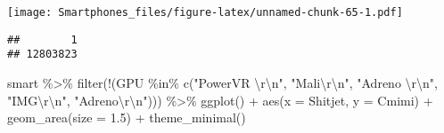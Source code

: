 \documentclass[
]{article}
\newenvironment{Shaded}{\begin{snugshade}}{\end{snugshade}}
\newcommand{\AttributeTok}[1]{\textcolor[rgb]{0.77,0.63,0.00}{#1}}
\newcommand{\CommentTok}[1]{\textcolor[rgb]{0.56,0.35,0.01}{\textit{#1}}}
\newcommand{\DecValTok}[1]{\textcolor[rgb]{0.00,0.00,0.81}{#1}}
\newcommand{\FloatTok}[1]{\textcolor[rgb]{0.00,0.00,0.81}{#1}}
\newcommand{\FunctionTok}[1]{\textcolor[rgb]{0.00,0.00,0.00}{#1}}
\newcommand{\NormalTok}[1]{#1}
\newcommand{\OtherTok}[1]{\textcolor[rgb]{0.56,0.35,0.01}{#1}}
\newcommand{\SpecialCharTok}[1]{\textcolor[rgb]{0.00,0.00,0.00}{#1}}
\newcommand{\StringTok}[1]{\textcolor[rgb]{0.31,0.60,0.02}{#1}}
\begin{document}
\texttt{[image: Smartphones\_files/figure-latex/unnamed-chunk-65-1.pdf]}

\begin{Shaded}
\end{Shaded}

\begin{verbatim}
##        1 
## 12803823
\end{verbatim}

\begin{Shaded}
\begin{Highlighting}[]
\NormalTok{smart }\SpecialCharTok{\%\textgreater{}\%}
 \FunctionTok{filter}\NormalTok{(}\SpecialCharTok{!}\NormalTok{(GPU }\SpecialCharTok{\%in\%} \FunctionTok{c}\NormalTok{(}\StringTok{"PowerVR }\SpecialCharTok{\textbackslash{}r\textbackslash{}n}\StringTok{"}\NormalTok{, }\StringTok{"Mali}\SpecialCharTok{\textbackslash{}r\textbackslash{}n}\StringTok{"}\NormalTok{, }\StringTok{"Adreno }\SpecialCharTok{\textbackslash{}r\textbackslash{}n}\StringTok{"}\NormalTok{, }\StringTok{"IMG}\SpecialCharTok{\textbackslash{}r\textbackslash{}n}\StringTok{"}\NormalTok{, }\StringTok{"Adreno}\SpecialCharTok{\textbackslash{}r\textbackslash{}n}\StringTok{"}\NormalTok{))) }\SpecialCharTok{\%\textgreater{}\%}
 \FunctionTok{ggplot}\NormalTok{() }\SpecialCharTok{+}
  \FunctionTok{aes}\NormalTok{(}\AttributeTok{x =}\NormalTok{ Shitjet, }\AttributeTok{y =}\NormalTok{ Cmimi) }\SpecialCharTok{+}
  \FunctionTok{geom\_area}\NormalTok{(}\AttributeTok{size =} \FloatTok{1.5}\NormalTok{) }\SpecialCharTok{+}
  \FunctionTok{theme\_minimal}\NormalTok{()}
\end{Highlighting}
\end{Shaded}
\end{document}
